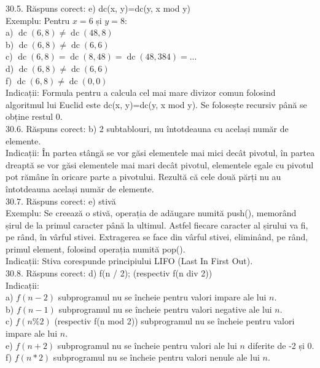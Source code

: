30.5. Răspuns corect: e) dc(x, y)=dc(y, x mod y)\\
Exemplu: Pentru $x=6$ și $y=8$:\\ a) $\operatorname{dc}(6,8) \neq \operatorname{dc}(48,8)$\\ b) $\operatorname{dc}(6,8) \neq \operatorname{dc}(6,6)$\\ c) $\operatorname{dc}(6,8)=\operatorname{dc}(8,48)=\operatorname{dc}(48,384)=...$\\ d) $\operatorname{dc}(6,8) \neq \operatorname{dc}(6,6)$\\ f) $\operatorname{dc}(6,8) \neq \operatorname{dc}(0,0)$\\ Indicații: Formula pentru a calcula cel mai mare divizor comun folosind algoritmul lui Euclid este dc(x, y)=dc(y, x mod y). Se folosește recursiv până se obține restul 0.\\

30.6. Răspuns corect: b) 2 subtablouri, nu întotdeauna cu același număr de elemente.\\
Indicații: În partea stângă se vor găsi elementele mai mici decât pivotul, în partea dreaptă se vor găsi elementele mai mari decât pivotul, elementele egale cu pivotul pot rămâne în oricare parte a pivotului. Rezultă că cele două părți nu au întotdeauna același număr de elemente.\\

30.7. Răspuns corect: e) stivă\\
Exemplu: Se creează o stivă, operația de adăugare numită push(), memorând șirul de la primul caracter până la ultimul. Astfel fiecare caracter al șirului va fi, pe rând, în vârful stivei. Extragerea se face din vârful stivei, eliminând, pe rând, primul element, folosind operația numită pop().\\ Indicații: Stiva corespunde principiului LIFO (Last In First Out).\\

30.8. Răspuns corect: d) f(n / 2); (respectiv f(n div 2))\\
Indicații:\\ a) $f(n-2)$ subprogramul nu se încheie pentru valori impare ale lui $n$.\\ b) $f(n-1)$ subprogramul nu se încheie pentru valori negative ale lui $n$.\\ c) $f(n \% 2)$ (respectiv f(n mod 2)) subprogramul nu se încheie pentru valori impare ale lui $n$.\\ e) $f(n+2)$ subprogramul nu se încheie pentru valori ale lui $n$ diferite de -2 și 0.\\ f) $f(n * 2)$ subprogramul nu se încheie pentru valori nenule ale lui $n$.\\

